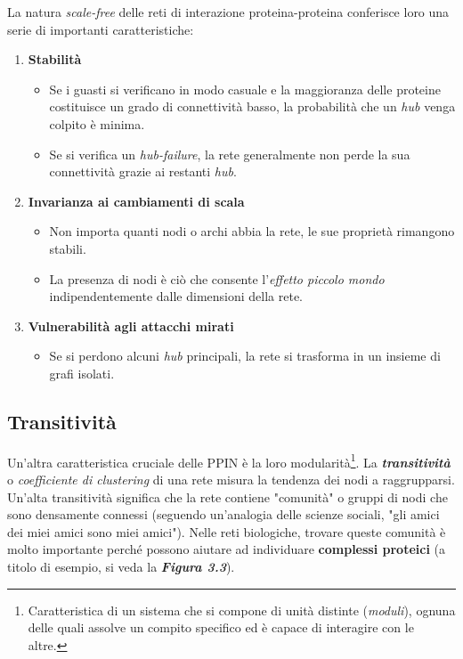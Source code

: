 \documentclass[11pt]{article}
\begin{document}
La natura \textit{scale-free} delle reti di interazione proteina-proteina conferisce loro una serie di importanti caratteristiche:
\begin{enumerate}
\setlength{\itemsep}{1pt}
  \setlength{\parskip}{0pt}
  \setlength{\parsep}{0pt}
\item \textbf{Stabilità}
\begin{itemize}
\setlength{\itemsep}{1pt}
  \setlength{\parskip}{0pt}
  \setlength{\parsep}{0pt}
\item Se i guasti si verificano in modo casuale e la maggioranza delle proteine costituisce un grado di connettività basso, la probabilità che un \textit{hub} venga colpito è minima.
\item Se si verifica un \textit{hub-failure}, la rete generalmente non perde la sua connettività grazie ai restanti \textit{hub}.
\end{itemize}

\item \textbf{Invarianza ai cambiamenti di scala}
\begin{itemize}
\item Non importa quanti nodi o archi abbia la rete, le sue proprietà rimangono stabili.
\item La presenza di nodi è ciò che consente l'\textit{effetto piccolo mondo} indipendentemente dalle dimensioni della rete.
\end{itemize}

\item \textbf{Vulnerabilità agli attacchi mirati}
\begin{itemize}
\item Se si perdono alcuni \textit{hub} principali, la rete si trasforma in un insieme di grafi isolati.
\end{itemize}
\end{enumerate}

\subsection{Transitività}
Un'altra caratteristica cruciale delle PPIN è la loro modularità\footnote{Caratteristica di un sistema che si compone di unità distinte (\textit{moduli}), ognuna delle quali assolve un compito specifico ed è capace di interagire con le altre.}. La \textit{\textbf{transitività}} o \textit{coefficiente di clustering} di una rete misura la tendenza dei nodi a raggrupparsi. Un'alta transitività significa che la rete contiene "comunità" o gruppi di nodi che sono densamente connessi (seguendo un'analogia delle scienze sociali, "gli amici dei miei amici sono miei amici"). Nelle reti biologiche, trovare queste comunità è molto importante perché possono aiutare ad individuare  \textbf{complessi proteici} (a titolo di esempio, si veda la \textit{\textbf{Figura 3.3}}).
\end{document}
